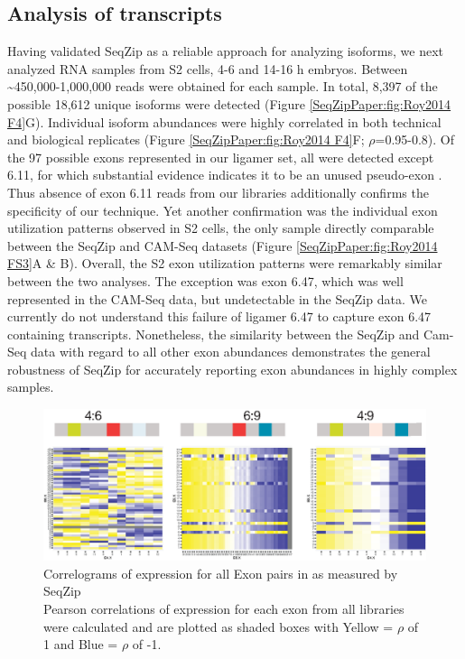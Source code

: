 	\subsection{Analysis of \dscam{} transcripts}
		\label{SeqZipPaper:subsec:SeqZip of endogenous Dscam}
	
		Having validated SeqZip as a reliable approach for analyzing \dscam{} isoforms, we next analyzed RNA samples from S2 cells, 4-6 and 14-16 h embryos. Between \textasciitilde 450,000-1,000,000 reads were obtained for each sample. In total, 8,397 of the possible 18,612 unique isoforms were detected (Figure \ref{SeqZipPaper:fig:Roy2014 F4}G). Individual isoform abundances were highly correlated in both technical and biological replicates (Figure \ref{SeqZipPaper:fig:Roy2014 F4}F; $\rho$=0.95-0.8). Of the 97 possible exons represented in our ligamer set, all were detected except 6.11, for which substantial evidence indicates it to be an unused pseudo-exon \citep{Neves2004,Zhan2004,Watson2005,Sun2013}. Thus absence of exon 6.11 reads from our libraries additionally confirms the specificity of our technique. Yet another confirmation was the individual exon utilization patterns observed in S2 cells, the only sample directly comparable between the SeqZip and CAM-Seq datasets (Figure \ref{SeqZipPaper:fig:Roy2014 FS3}A \& B). Overall, the S2 exon utilization patterns were remarkably similar between the two analyses. The exception was exon 6.47, which was well represented in the CAM-Seq data, but undetectable in the SeqZip data. We currently do not understand this failure of ligamer 6.47 to capture exon 6.47 containing transcripts. Nonetheless, the similarity between the SeqZip and Cam-Seq data with regard to all other exon abundances demonstrates the general robustness of SeqZip for accurately reporting exon abundances in highly complex samples.

		\begin{figure} %
		  \centering 
		  \includegraphics{Figures/SeqZipPaper/Roy2014FigS4.eps}
		  \caption[Roy et al 2014 Figure S4]
		  {Correlograms of expression for all Exon pairs in \dscam{} as measured by SeqZip\\[0.25cm]
		    Pearson correlations of expression for each exon from all libraries were calculated and are plotted as shaded boxes with Yellow = $\rho$ of 1 and Blue = $\rho$ of -1.
		    }
		  \label{SeqZipPaper:fig:Roy2014 S4}
		  \end{figure}

